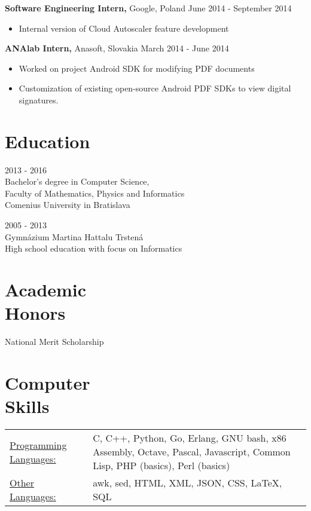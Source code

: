 \documentclass[margin]{res}
\begin{document}
\begin{resume}
{\bf Software Engineering Intern,} Google, Poland \hfill June 2014 - September 2014
\begin{itemize} \itemsep -2pt %
\item Internal version of Cloud Autoscaler feature development
\end{itemize}

{\bf ANAlab Intern,} Anasoft, Slovakia \hfill March 2014 - June 2014
\begin{itemize} \itemsep -2pt  %
\item Worked on project Android SDK for modifying PDF documents
\item Customization of existing open-source Android PDF SDKs to view digital signatures.
\end{itemize}


\section{Education}
2013 - 2016 \\
Bachelor's degree in Computer Science, \\ 
Faculty of Mathematics, Physics and Informatics \\
Comenius University in Bratislava

2005 - 2013 \\
Gymn\'{a}zium Martina Hattalu Trsten\'{a} \\
High school education with focus on Informatics

\section{Academic \\ Honors}
National Merit Scholarship

\section{Computer \\ Skills}
   \begin{tabular}{l p{3in}}
       \underline{Programming Languages:} & C, C++, Python, Go, Erlang, GNU bash, x86 Assembly, Octave, Pascal, Javascript, Common Lisp, PHP (basics), Perl (basics) \\
       \underline{Other Languages:} & awk, sed, HTML, XML, JSON, CSS, \LaTeX, SQL \\


\end{tabular}
\end{resume}
\end{document}
